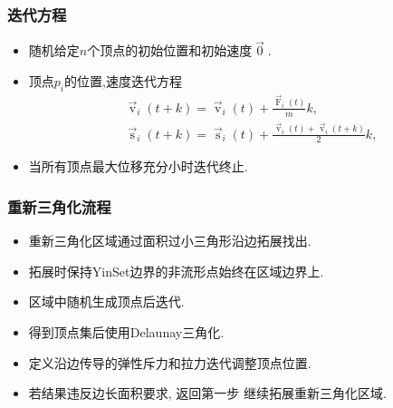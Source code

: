 \documentclass[UTF8]{ctexbeamer}	%
\theoremstyle{plain}
\theoremstyle{definition}
\theoremstyle{remark}
\numberwithin{equation}{section}
\begin{document}
\begin{frame}
    \frametitle{迭代方程}
        \begin{itemize}
            \item 随机给定$n$个顶点的初始位置和初始速度$\mathop{0}\limits^{\rightarrow}$.
            \item 顶点$p_i$的位置,速度迭代方程
            \begin{equation}
                \label{equ:visi}
                \begin{aligned}
                &  {\mathop{v}\limits^{\rightarrow}}_{i}(t+k) = {\mathop{v}\limits^{\rightarrow}}_{i}(t) + \frac{{\mathop{F}\limits^{\rightarrow}}_{i}(t)}{m}k,\\
                 & {\mathop{s}\limits^{\rightarrow}}_{i}(t+k) = {\mathop{s}\limits^{\rightarrow}}_{i}(t) + \frac{{\mathop{v}\limits^{\rightarrow}}_{i}(t) + {\mathop{v}\limits^{\rightarrow}}_{i}(t+k)}{2}k,
                  \end{aligned}
              \end{equation}

              \item 当所有顶点最大位移充分小时迭代终止.
        \end{itemize}
\end{frame}

\begin{frame}
    \frametitle{重新三角化流程}
        \begin{itemize}
            \item 重新三角化区域通过面积过小三角形沿边拓展找出.
            \item 拓展时保持YinSet边界的非流形点始终在区域边界上.
            \item 区域中随机生成顶点后迭代.
            \item 得到顶点集后使用Delaunay三角化.
            \item 定义沿边传导的弹性斥力和拉力迭代调整顶点位置.
            \item 若结果违反边长面积要求, 返回第一步
            继续拓展重新三角化区域.
        \end{itemize}
\end{frame}
\end{document}
